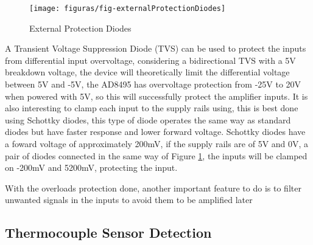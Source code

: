 		\begin{figure}[htbp]
			\centering
				\texttt{[image: figuras/fig-externalProtectionDiodes]}
			\caption{External Protection Diodes \cite{externalProtectionDiodes}}
			\label{fig:externalProtectionDiodes}
		\end{figure}
		
	A Transient Voltage Suppression Diode (TVS) can be used to protect the inputs from differential input overvoltage, considering a bidirectional TVS with a 5V breakdown voltage, the device will theoretically limit the differential voltage between 5V and -5V, the AD8495 has overvoltage protection from -25V to 20V when powered with 5V, so this will successfully protect the amplifier inputs. It is also interesting to clamp each input to the supply rails using, this is best done using Schottky diodes, this type of diode operates the same way as standard diodes but have faster response and lower forward voltage. Schottky diodes have a foward voltage of approximately 200mV, if the supply rails are of 5V and 0V, a pair of diodes connected in the same way of Figure \ref{fig:externalProtectionDiodes}, the inputs will be clamped on -200mV and 5200mV, protecting the input.
	\par
	With the overloads protection done, another important feature to do is to filter unwanted signals in the inputs to avoid them to be amplified later

	\subsection{Thermocouple Sensor Detection}
		 

